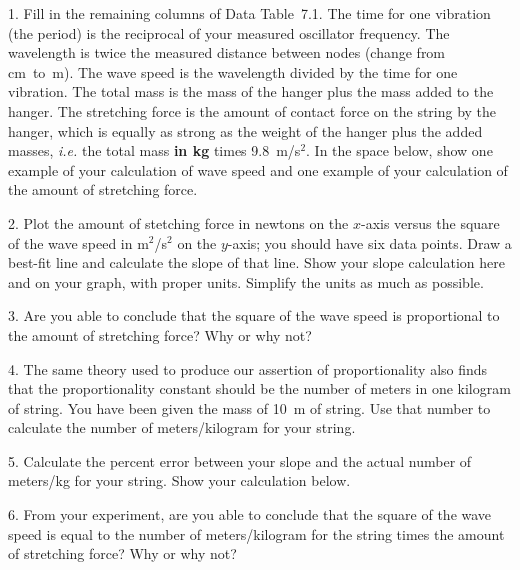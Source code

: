 \item{1.} Fill in the remaining columns of 
Data Table~7.1.  The time for one vibration (the
period) is the reciprocal of your measured oscillator 
frequency.  The wavelength is twice the measured 
distance between nodes (change from cm~to~m).  The 
wave speed is the wavelength divided by the time for 
one vibration.  The total mass is the mass of the 
hanger plus the mass added to the hanger.  The 
stretching force is the amount of contact force on 
the string by the hanger, which is equally as strong 
as the weight of the hanger plus the added masses, 
{\it i.e.} the total mass {\bf in kg} times 9.8~m/s$^2$.  
In the space below, show one example of your 
calculation of wave speed and one example of your 
calculation of the amount of stretching force.
\item{2.} Plot the amount of stetching force in
newtons on the $x$-axis versus the square of the
wave speed in m$^2$/s$^2$ on the $y$-axis; you
should have six data points.  Draw a best-fit
line and calculate the slope of that line.  Show
your slope calculation here and on your graph, with 
proper units.  Simplify the units as much as possible.
\vfil\eject
\item{3.} Are you able to conclude that the square
of the wave speed is proportional to the amount
of stretching force?  Why or why not?
\item{4.} The same theory used to produce our
assertion of proportionality also finds that the 
proportionality constant should be the number of 
meters in one kilogram of string.  You have been 
given the mass of 10~m of string.  Use that number 
to calculate the number of meters/kilogram for your 
string.
\item{5.} Calculate the percent error between
your slope and the actual number of meters/kg
for your string.  Show your calculation below.
\item{6.} From your experiment, are you able
to conclude that the square of the wave speed
is equal to the number of meters/kilogram for
the string times the amount of stretching force?
Why or why not?
\vfil\eject
\nopagenumbers
